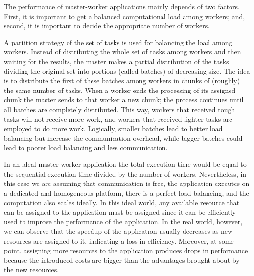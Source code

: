 \documentclass[11pt,a4paper, oneside]{book} %
\begin{document}

The performance of master-worker applications mainly depends of two factors. First, it is important to get a balanced computational load among workers; and, second, it is important to decide the appropriate number of workers.

A partition strategy of the set of tasks is used for balancing the load among workers. Instead of distributing the whole set of tasks among workers and then waiting for the results, the master makes a partial distribution of the tasks dividing the original set into portions (called batches) of decreasing size. The idea is to distribute the first of these batches among workers in chunks of (roughly) the same number of tasks. When a worker ends the processing of its assigned chunk the master sends to that worker a new chunk; the process continues until all batches are completely distributed. This way, workers that received tough tasks will not receive more work, and workers that received lighter tasks are employed to do more work. Logically, smaller batches lead to better load balancing but increase the communication overhead, while bigger batches could lead to poorer load balancing and less communication.

In an ideal master-worker application the total execution time would be equal to the sequential execution time divided by the number of workers. Nevertheless, in this case we are assuming that communication is free, the application executes on a dedicated and homogeneous platform, there is a perfect load balancing, and the computation also scales ideally. In this ideal world, any available resource that can be assigned to the application must be assigned since it can be efficiently used to improve the performance of the application. In the real world, however, we can observe that the speedup of the application usually decreases as new resources are assigned to it, indicating a loss in efficiency. Moreover, at some point, assigning more resources to the application produces drops in performance because the introduced costs are bigger than the advantages brought about by the new resources.
\end{document}
